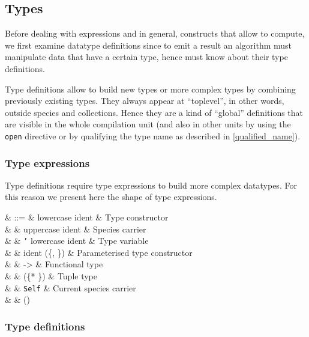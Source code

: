 \subsection{Types}
Before dealing with expressions and in general, constructs that allow
to compute, we first examine datatype definitions since to emit a
result an algorithm must manipulate data that have a certain type,
hence must know about their type definitions.

Type definitions allow to build new types or more complex types by
combining previously existing types. They always appear at
``toplevel'', in other words, outside species and collections. Hence
they are a kind of ``global'' definitions that are visible in the
whole compilation unit (and also in other units by using the
{\tt open} directive or by qualifying the type name as described in
\ref{qualified_name}).



\subsubsection{Type expressions}
Type definitions require type expressions to build more complex
datatypes. For this reason we present here the shape of type
expressions.

\vspace{0.2cm}
\begin{syntax}
\tau & ::= & lowercase ident   & Type constructor \\
     & \mid & uppercase ident & Species carrier \\
     & \mid & {\tt '} lowercase ident & Type variable \\
     & \mid & ident (\tau \{, \tau \}) & Parameterised type constructor \\
     & \mid & \tau -> \tau & Functional type \\
     & \mid & (\tau * \tau \{* \tau \}) & Tuple type \\
     & \mid & {\tt Self} & Current species carrier \\
     & \mid & (\tau)
\end{syntax}
\vspace{0.2cm}



\subsubsection{Type definitions}


